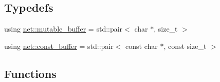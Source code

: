 \subsection*{Typedefs}
\begin{DoxyCompactItemize}
\item 
using \hyperlink{namespacenet_ac0df3fa0efbc044d8a2441906e8f61cb}{net\-::mutable\-\_\-buffer} = std\-::pair$<$ char $\ast$, size\-\_\-t $>$
\item 
using \hyperlink{namespacenet_a05639001760fe5164b163078b5ccc2c0}{net\-::const\-\_\-buffer} = std\-::pair$<$ const char $\ast$, const size\-\_\-t $>$
\end{DoxyCompactItemize}
\subsection*{Functions}
